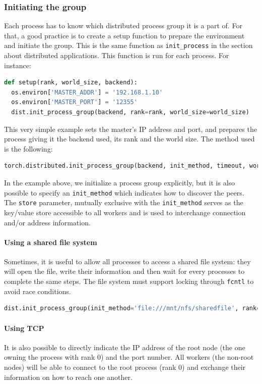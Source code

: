 \documentclass{article}
\begin{document}
\subsubsection{Initiating the group}
Each process has to know which distributed process group it is a part of. For that, a good practice is to create a setup function to prepare the environment and initiate the group. This is the same function as \lstinline{init_process} in the section about distributed applications. This function is run for each process. For instance:
\begin{lstlisting}[language=Python]
def setup(rank, world_size, backend):
  os.environ['MASTER_ADDR'] = '192.168.1.10'
  os.environ['MASTER_PORT'] = '12355'
  dist.init_process_group(backend, rank=rank, world_size=world_size)
\end{lstlisting}
This very simple example sets the master's IP address and port, and prepares the process giving it the backend used, its rank and the world size.
The method used is the following:
\begin{lstlisting}[language=Python]
torch.distributed.init_process_group(backend, init_method, timeout, world_size, rank, store, group_name, pg_options)
\end{lstlisting}
In the example above, we initialize a process group explicitly, but it is also possible to specify an \lstinline{init_method} which indicates how to discover the peers. The \lstinline{store} parameter, mutually exclusive with the \lstinline{init_method} serves as the key/value store accessible to all workers and is used to interchange connection and/or address information.

\paragraph{Using a shared file system}
Sometimes, it is useful to allow all processes to access a shared file system: they will open the file, write their information and then wait for every processes to complete the same steps. The file system must support locking through \lstinline{fcntl} to avoid race conditions.

\begin{lstlisting}[language=Python]
dist.init_process_group(init_method='file:///mnt/nfs/sharedfile', rank=rank, world_size=size)
\end{lstlisting}

\paragraph{Using TCP}
It is also possible to directly indicate the IP address of the root node (the one owning the process with rank 0) and the port number. All workers (the non-root nodes) will be able to connect to the root process (rank 0) and exchange their information on how to reach one another.
\end{document}
